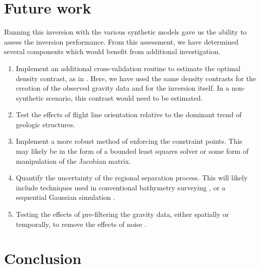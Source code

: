 \section{Future work}

Running this inversion with the various synthetic models gave us the ability to assess the inversion performance. From this assessment, we have determined several components which would benefit from additional investigation. 

\begin{enumerate}
    \item Implement an additional cross-validation routine to estimate the optimal density contrast, as in \citet{uiedafast2017}. Here, we have used the same density contrasts for the creation of the observed gravity data and for the inversion itself. In a non-synthetic scenario, this contrast would need to be estimated.
    \item Test the effects of flight line orientation relative to the dominant trend of geologic structures.
    \item Implement a more robust method of enforcing the constraint points. This may likely be in the form of a bounded least squares solver or some form of manipulation of the Jacobian matrix. 
    \item Quantify the uncertainty of the regional separation process. This will likely include techniques used in conventional bathymetry surveying \citep{calderdevelopment2017, bourgeoisachieving2016}, or a sequential Gaussian simulation \citep{perozziquantitative2021}.
    \item Testing the effects of pre-filtering the gravity data, either spatially or temporally, to remove the effects of noise \citep{jordanaerogravity2010}.
\end{enumerate}

\section{Conclusion}

